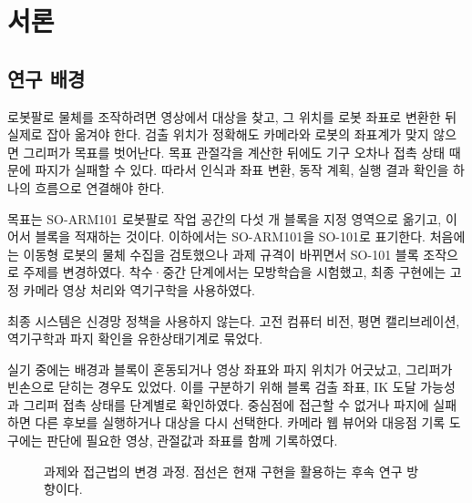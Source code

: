 \chapter{서론}
\section{연구 배경}
로봇팔로 물체를 조작하려면 영상에서 대상을 찾고, 그 위치를 로봇 좌표로 변환한 뒤 실제로 잡아 옮겨야 한다. 검출 위치가 정확해도 카메라와 로봇의 좌표계가 맞지 않으면 그리퍼가 목표를 벗어난다. 목표 관절각을 계산한 뒤에도 기구 오차나 접촉 상태 때문에 파지가 실패할 수 있다. 따라서 인식과 좌표 변환, 동작 계획, 실행 결과 확인을 하나의 흐름으로 연결해야 한다.

목표는 SO-ARM101 로봇팔로 작업 공간의 다섯 개 블록을 지정 영역으로 옮기고, 이어서 블록을 적재하는 것이다. 이하에서는 SO-ARM101을 SO-101로 표기한다. 처음에는 이동형 로봇의 물체 수집을 검토했으나 과제 규격이 바뀌면서 SO-101 블록 조작으로 주제를 변경하였다. 착수·중간 단계에서는 모방학습을 시험했고, 최종 구현에는 고정 카메라 영상 처리와 역기구학을 사용하였다.

최종 시스템은 신경망 정책을 사용하지 않는다. 고전 컴퓨터 비전, 평면 캘리브레이션, 역기구학과 파지 확인을 유한상태기계로 묶었다.

실기 중에는 배경과 블록이 혼동되거나 영상 좌표와 파지 위치가 어긋났고, 그리퍼가 빈손으로 닫히는 경우도 있었다. 이를 구분하기 위해 블록 검출 좌표, IK 도달 가능성과 그리퍼 접촉 상태를 단계별로 확인하였다. 중심점에 접근할 수 없거나 파지에 실패하면 다른 후보를 실행하거나 대상을 다시 선택한다. 카메라 웹 뷰어와 대응점 기록 도구에는 판단에 필요한 영상, 관절값과 좌표를 함께 기록하였다.

\begin{figure}[htbp]
\centering
{}
\caption{과제와 접근법의 변경 과정. 점선은 현재 구현을 활용하는 후속 연구 방향이다.}
\label{fig:research-path}
\end{figure}

